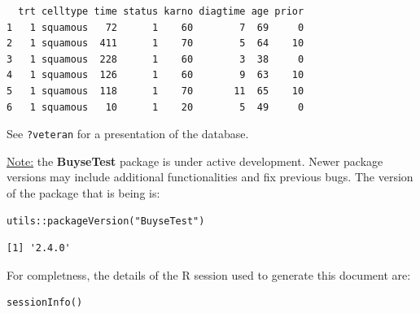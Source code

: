 \documentclass[12pt]{article}
\begin{document}
\begin{verbatim}
  trt celltype time status karno diagtime age prior
1   1 squamous   72      1    60        7  69     0
2   1 squamous  411      1    70        5  64    10
3   1 squamous  228      1    60        3  38     0
4   1 squamous  126      1    60        9  63    10
5   1 squamous  118      1    70       11  65    10
6   1 squamous   10      1    20        5  49     0
\end{verbatim}


See \texttt{?veteran} for a presentation of the database.

\bigskip

\uline{Note:} the \textbf{BuyseTest} package is under active development. Newer
package versions may include additional functionalities and fix
previous bugs. The version of the package that is being is:
\lstset{language=r,label= ,caption= ,captionpos=b,numbers=none}
\begin{lstlisting}
utils::packageVersion("BuyseTest")
\end{lstlisting}

\begin{verbatim}
[1] '2.4.0'
\end{verbatim}


For completness, the details of the R session used to generate this
document are:
\lstset{language=r,label= ,caption= ,captionpos=b,numbers=none}
\begin{lstlisting}
sessionInfo()
\end{lstlisting}
\end{document}
